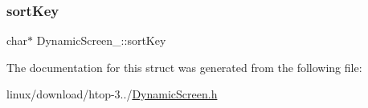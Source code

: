 \mbox{\label{structDynamicScreen___a520443cf839a6a4f66acef73804474bf}} 
\subsubsection{\texorpdfstring{sort\+Key}{sortKey}}
{\footnotesize\ttfamily char$\ast$ Dynamic\+Screen\+\_\+\+::sort\+Key}



The documentation for this struct was generated from the following file\+:\begin{DoxyCompactItemize}
\item 
linux/download/htop-\/3../\hyperlink{DynamicScreen_8h}{Dynamic\+Screen.\+h}\end{DoxyCompactItemize}
